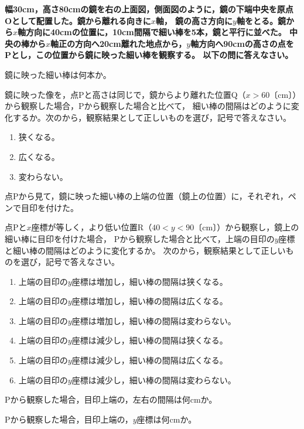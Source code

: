 \item
\begin{mawarikomi}{260pt}{}
{\bf 幅30cm，高さ80cmの鏡を右の上面図，側面図のように，鏡の下端中央を原点Oとして配置した。鏡から離れる向きに$x$軸，
鏡の高さ方向に$y$軸をとる。鏡から$x$軸方向に40cmの位置に，10cm間隔で細い棒を5本，鏡と平行に並べた。
中央の棒から$x$軸正の方向へ20cm離れた地点から，$y$軸方向へ90cmの高さの点をPとし，この位置から鏡に映った細い棒を観察する。
以下の問に答えなさい。
}
	\begin{Enumerate}
	\item 鏡に映った細い棒は何本か。
	\item 鏡に映った像を，点Pと高さは同じで，鏡からより離れた位置Q（$x>60$〔cm〕）から観察した場合，Pから観察した場合と比べて，
	細い棒の間隔はどのように変化するか。次の\santaku から，観察結果として正しいものを選び，記号で答えなさい。
		\begin{enumerate}
		\item 狭くなる。
		\item 広くなる。
		\item 変わらない。
		\end{enumerate}
	\end{Enumerate}
	点Pから見て，鏡に映った細い棒の上端の位置（鏡上の位置）に，それぞれ，ペンで目印を付けた。
	\begin{Enumerate*}
	\item 点Pと$x$座標が等しく，より低い位置R（$40<y<90$〔cm〕）から観察し，鏡上の細い棒に目印を付けた場合，
	Pから観察した場合と比べて，上端の目印の$y$座標と細い棒の間隔はどのように変化するか。
	次の\rokutaku から，観察結果として正しいものを選び，記号で答えなさい。
		\begin{enumerate}
		\item 上端の目印の$y$座標は増加し，細い棒の間隔は狭くなる。
		\item 上端の目印の$y$座標は増加し，細い棒の間隔は広くなる。
		\item 上端の目印の$y$座標は増加し，細い棒の間隔は変わらない。
		\item 上端の目印の$y$座標は減少し，細い棒の間隔は狭くなる。
		\item 上端の目印の$y$座標は減少し，細い棒の間隔は広くなる。
		\item 上端の目印の$y$座標は減少し，細い棒の間隔は変わらない。
		\end{enumerate}
	\item Pから観察した場合，目印上端の，左右の間隔は何cmか。
	\item Pから観察した場合，目印上端の，$y$座標は何cmか。
\newpage
	\end{Enumerate*}
\end{mawarikomi}
